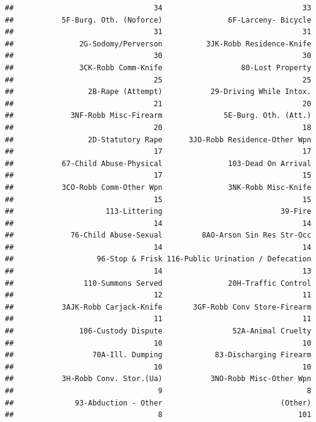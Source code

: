 \documentclass[]{book}
\theoremstyle{definition}
\theoremstyle{definition}
\theoremstyle{remark}
\begin{document}
\begin{verbatim}
##                                34                                33 
##           5F-Burg. Oth. (Noforce)               6F-Larceny- Bicycle 
##                                31                                31 
##               2G-Sodomy/Perverson          3JK-Robb Residence-Knife 
##                                30                                30 
##               3CK-Robb Comm-Knife                  80-Lost Property 
##                                25                                25 
##                 2B-Rape (Attempt)           29-Driving While Intox. 
##                                21                                20 
##             3NF-Robb Misc-Firearm              5E-Burg. Oth. (Att.) 
##                                20                                18 
##                 2D-Statutory Rape      3JO-Robb Residence-Other Wpn 
##                                17                                17 
##           67-Child Abuse-Physical               103-Dead On Arrival 
##                                17                                15 
##           3CO-Robb Comm-Other Wpn               3NK-Robb Misc-Knife 
##                                15                                15 
##                     113-Littering                           39-Fire 
##                                14                                14 
##             76-Child Abuse-Sexual         8AO-Arson Sin Res Str-Occ 
##                                14                                14 
##                   96-Stop & Frisk 116-Public Urination / Defecation 
##                                14                                13 
##                110-Summons Served               20H-Traffic Control 
##                                12                                11 
##           3AJK-Robb Carjack-Knife       3GF-Robb Conv Store-Firearm 
##                                11                                11 
##               106-Custody Dispute                52A-Animal Cruelty 
##                                10                                10 
##                  70A-Ill. Dumping            83-Discharging Firearm 
##                                10                                10 
##           3H-Robb Conv. Stor.(Ua)           3NO-Robb Misc-Other Wpn 
##                                 9                                 8 
##              93-Abduction - Other                           (Other) 
##                                 8                               101
\end{verbatim}
\end{document}
